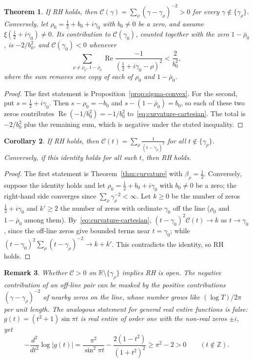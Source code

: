 \documentclass[11pt]{amsart}
\newtheorem{theorem}{Theorem}[section]
\newtheorem{corollary}[theorem]{Corollary}
\newtheorem{remark}[theorem]{Remark}
\renewcommand{\Re}{\operatorname{Re}}
\begin{document}
\begin{theorem}\label{thm:rh-curvature}
If RH holds, then $\mathcal C(\gamma)=\sum_\rho(\gamma-\gamma_\rho)^{-2}>0$ for every
$\gamma\notin\{\gamma_\rho\}$. Conversely, let $\rho_0=\tfrac12+b_0+i\gamma_0$ with
$b_0\neq0$ be a zero, and assume $\xi(\tfrac12+i\gamma_0)\neq0$. Its contribution to
$\mathcal C(\gamma_0)$, counted together with the zero $1-\bar\rho_0$, is $-2/b_0^2$, and
$\mathcal C(\gamma_0)<0$ whenever
\[
  \sum_{\rho\neq\rho_0,\,1-\bar\rho_0}\Re\frac{-1}{(\tfrac12+i\gamma_0-\rho)^2}<\frac{2}{b_0^2},
\]
where the sum removes one copy of each of $\rho_0$ and $1-\bar\rho_0$.
\end{theorem}

\begin{proof}
The first statement is Proposition~\ref{prop:sigma-convex}. For the second, put
$s=\tfrac12+i\gamma_0$. Then $s-\rho_0=-b_0$ and $s-(1-\bar\rho_0)=b_0$, so each of these two
zeros contributes $\Re(-1/b_0^2)=-1/b_0^2$ to~\eqref{eq:curvature-cartesian}. The total is
$-2/b_0^2$ plus the remaining sum, which is negative under the stated inequality.
\end{proof}

\begin{corollary}
If RH holds, then $\mathcal{C}(t) = \displaystyle\sum_\rho \frac{1}{(t-\gamma_\rho)^2}$
for all $t \notin \{\gamma_\rho\}$. Conversely, if this identity holds for all such $t$,
then RH holds.
\end{corollary}

\begin{proof}
The first statement is Theorem~\ref{thm:curvature} with $\beta_\rho=\tfrac12$. Conversely,
suppose the identity holds and let $\rho_0=\tfrac12+b_0+i\gamma_0$ with $b_0\ne0$ be a zero;
the right-hand side converges since $\sum_\rho\gamma_\rho^{-2}<\infty$. Let $k\ge0$ be the
number of zeros $\tfrac12+i\gamma_0$ and $k'\ge2$ the number of zeros with ordinate $\gamma_0$
off the line ($\rho_0$ and $1-\bar\rho_0$ among them). By~\eqref{eq:curvature-cartesian},
$(t-\gamma_0)^2\mathcal C(t)\to k$ as $t\to\gamma_0$, since the off-line zeros give bounded
terms near $t=\gamma_0$; while $(t-\gamma_0)^2\sum_\rho(t-\gamma_\rho)^{-2}\to k+k'$. This
contradicts the identity, so RH holds.
\end{proof}

\begin{remark}\label{rem:counterexample}
Whether $\mathcal C>0$ on $\mathbb R\setminus\{\gamma_\rho\}$ implies RH is open. The
negative contribution of an off-line pair can be masked by the positive contributions
$(\gamma-\gamma_\rho)^{-2}$ of nearby zeros on the line, whose number grows like
$(\log T)/2\pi$ per unit length. The analogous statement for general real entire functions
is false: $g(t)=(t^2+1)\sin\pi t$ is real entire of order one with the non-real zeros $\pm i$,
yet
\[
  -\frac{d^2}{dt^2}\log|g(t)|=\frac{\pi^2}{\sin^2\pi t}-\frac{2(1-t^2)}{(1+t^2)^2}
  \ge\pi^2-2>0\qquad(t\notin\mathbb Z).
\]
\end{remark}
\end{document}
